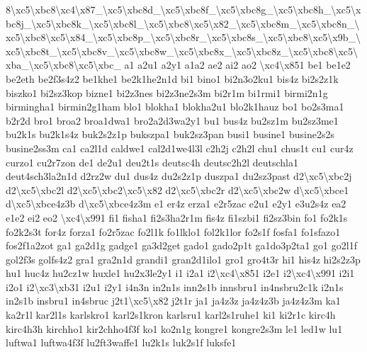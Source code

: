 \begin{DoxyCompactItemize}
8\textbackslash{}xc5\textbackslash{}xbc8\textbackslash{}xc4\textbackslash{}x87\-\_\textbackslash{}xc5\textbackslash{}xbc8d\-\_\textbackslash{}xc5\textbackslash{}xbc8f\-\_\textbackslash{}xc5\textbackslash{}xbc8g\-\_\textbackslash{}xc5\textbackslash{}xbc8h\-\_\textbackslash{}xc5\textbackslash{}xbc8j\-\_\textbackslash{}xc5\textbackslash{}xbc8k\-\_\textbackslash{}xc5\textbackslash{}xbc8l\-\_\textbackslash{}xc5\textbackslash{}xbc8\textbackslash{}xc5\textbackslash{}x82\-\_\textbackslash{}xc5\textbackslash{}xbc8m\-\_\textbackslash{}xc5\textbackslash{}xbc8n\-\_\textbackslash{}xc5\textbackslash{}xbc8\textbackslash{}xc5\textbackslash{}x84\-\_\textbackslash{}xc5\textbackslash{}xbc8p\-\_\textbackslash{}xc5\textbackslash{}xbc8r\-\_\textbackslash{}xc5\textbackslash{}xbc8s\-\_\textbackslash{}xc5\textbackslash{}xbc8\textbackslash{}xc5\textbackslash{}x9b\-\_\textbackslash{}xc5\textbackslash{}xbc8t\-\_\textbackslash{}xc5\textbackslash{}xbc8v\-\_\textbackslash{}xc5\textbackslash{}xbc8w\-\_\textbackslash{}xc5\textbackslash{}xbc8x\-\_\textbackslash{}xc5\textbackslash{}xbc8z\-\_\textbackslash{}xc5\textbackslash{}xbc8\textbackslash{}xc5\textbackslash{}xba\-\_\textbackslash{}xc5\textbackslash{}xbc8\textbackslash{}xc5\textbackslash{}xbc\-\_\- a1 a2u1 a2y1 a1a2 ae2 ai2 ao2 \textbackslash{}xc4\textbackslash{}x851 be1 be1e2 be2eth be2f3s4z2 be1khe1 be2k1he2n1d bi1 bino1 bi2n3o2ku1 bis4z bi2s2z1k biszko1 bi2sz3kop bizne1 bi2z3nes bi2z3ne2s3m bi2r1m bi1rmi1 birmi2n1g birmingha1 birmin2g1ham blo1 blokha1 blokha2u1 blo2k1hauz bo1 bo2s3ma1 b2r2d bro1 broa2 broa1dwa1 bro2a2d3wa2y1 bu1 bus4z bu2sz1m bu2sz3me1 bu2k1s bu2k1s4z buk2s2z1p bukszpa1 buk2sz3pan busi1 busine1 busine2s2s busine2ss3m ca1 ca2l1d caldwe1 cal2d1we4l3l c2h2j c2h2l chu1 chus1t cu1 cur4z curzo1 cu2r7zon de1 de2u1 deu2t1s deutsc4h deutsc2h2l deutschla1 deut4sch3la2n1d d2rz2w du1 dus4z du2s2z1p duszpa1 du2sz3past d2\textbackslash{}xc5\textbackslash{}xbc2j d2\textbackslash{}xc5\textbackslash{}xbc2l d2\textbackslash{}xc5\textbackslash{}xbc2\textbackslash{}xc5\textbackslash{}x82 d2\textbackslash{}xc5\textbackslash{}xbc2r d2\textbackslash{}xc5\textbackslash{}xbc2w d\textbackslash{}xc5\textbackslash{}xbce1 d\textbackslash{}xc5\textbackslash{}xbce4z3b d\textbackslash{}xc5\textbackslash{}xbce4z3m e1 er4z erza1 e2r5zac e2u1 e2y1 e3u2s4z ea2 e1e2 ei2 eo2 \textbackslash{}xc4\textbackslash{}x991 fi1 fisha1 fi2s3ha2r1m fis4z fi1szbi1 fi2sz3bin fo1 fo2k1s fo2k2s3t for4z forza1 fo2r5zac fo2l1k fo1lklo1 fol2k1lor fo2s1f fosfa1 fo1sfazo1 fos2f1a2zot ga1 ga2d1g gadge1 ga3d2get gado1 gado2p1t ga1do3p2ta1 go1 go2l1f gol2f3s golfs4z2 gra1 gra2n1d grandi1 gran2d1ilo1 gro1 gro4t3r hi1 his4z hi2s2z3p hu1 huc4z hu2cz1w huxle1 hu2x3le2y1 i1 i2a1 i2\textbackslash{}xc4\textbackslash{}x851 i2e1 i2\textbackslash{}xc4\textbackslash{}x991 i2i1 i2o1 i2\textbackslash{}xc3\textbackslash{}xb31 i2u1 i2y1 i4n3n in2n1s inn2s1b innsbru1 in4nsbru2c1k i2n1s in2s1b insbru1 in4sbruc j2t1\textbackslash{}xc5\textbackslash{}x82 j2t1r ja1 ja4z3z ja4z4z3b ja4z4z3m ka1 ka2r1l kar2l1s karlskro1 karl2s1kron karlsru1 karl2s1ruhe1 ki1 ki2r1c kirc4h kirc4h3h kirchho1 kir2chho4f3f ko1 ko2n1g kongre1 kongre2s3m le1 led1w lu1 luftwa1 luftwa4f3f lu2ft3waffe1 lu2k1s luk2s1f luksfe1 
\end{DoxyCompactItemize}
